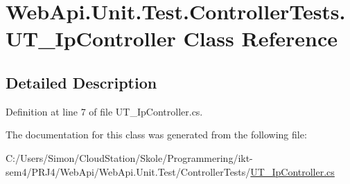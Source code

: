 \hypertarget{class_web_api_1_1_unit_1_1_test_1_1_controller_tests_1_1_u_t___ip_controller}{}\section{Web\+Api.\+Unit.\+Test.\+Controller\+Tests.\+U\+T\+\_\+\+Ip\+Controller Class Reference}
\label{class_web_api_1_1_unit_1_1_test_1_1_controller_tests_1_1_u_t___ip_controller}


\subsection{Detailed Description}


Definition at line 7 of file U\+T\+\_\+\+Ip\+Controller.\+cs.



The documentation for this class was generated from the following file\+:\begin{DoxyCompactItemize}
\item 
C\+:/\+Users/\+Simon/\+Cloud\+Station/\+Skole/\+Programmering/ikt-\/sem4/\+P\+R\+J4/\+Web\+Api/\+Web\+Api.\+Unit.\+Test/\+Controller\+Tests/\mbox{\hyperlink{_u_t___ip_controller_8cs}{U\+T\+\_\+\+Ip\+Controller.\+cs}}\end{DoxyCompactItemize}
